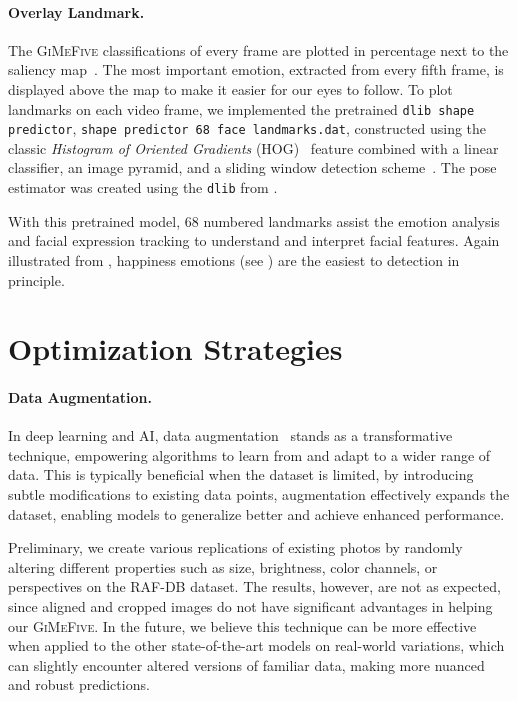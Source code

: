 \paragraph{Overlay Landmark.}
The \textsc{GiMeFive} classifications of every frame are plotted in percentage next to the saliency map~\cite{SimonyanVZ13}.
The most important emotion, extracted from every fifth frame, 
is displayed above the map to make it easier for our eyes to follow. 
To plot landmarks on each video frame, 
we implemented the pretrained \texttt{dlib shape predictor}, \texttt{shape predictor 68 face landmarks.dat}, 
constructed using the classic \textit{Histogram of Oriented Gradients} (HOG)~\cite{1467360} feature combined with a linear classifier, 
an image pyramid, and a sliding window detection scheme~\cite{dlib_site}. 
The pose estimator was created using the \texttt{dlib} from \citet{6909637}.

With this pretrained model, 
68 numbered landmarks assist the emotion analysis and facial expression tracking to understand and interpret facial features.
Again illustrated from , 
happiness emotions (see ) are the easiest to detection in principle. 

\section{Optimization Strategies}
\label{sec:optim}

\paragraph{Data Augmentation.}
In deep learning and AI, 
data augmentation~\cite{augment} stands as a transformative technique, 
empowering algorithms to learn from and adapt to a wider range of data. 
This is typically beneficial when the dataset is limited, 
by introducing subtle modifications to existing data points, 
augmentation effectively expands the dataset, 
enabling models to generalize better and achieve enhanced performance. 

Preliminary, 
we create various replications of existing photos by randomly altering different properties such as size, 
brightness, color channels, or perspectives on the RAF-DB dataset. 
The results, however, are not as expected, 
since aligned and cropped images do not have significant advantages in helping our \textsc{GiMeFive}. 
In the future, 
we believe this technique can be more effective when applied to the other state-of-the-art models on real-world variations, 
which can slightly encounter altered versions of familiar data, 
making more nuanced and robust predictions. 

